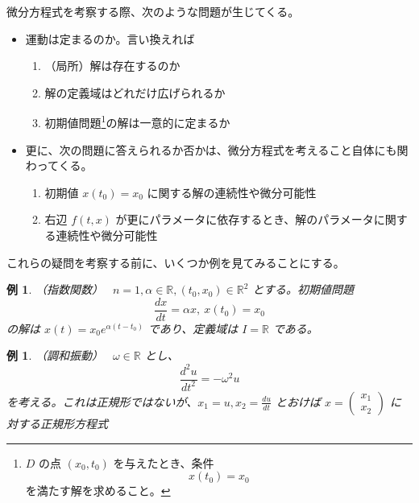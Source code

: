 \documentclass[dvipdfmx, a4paper]{jsreport}
\newcommand{\R}{\mathbb{R}}
\newcommand{\x}{\bm{x}}
\newtheorem{example}[theorem]{例}
\begin{document}
微分方程式を考察する際、次のような問題が生じてくる。

\begin{itemize}
    \item 運動は定まるのか。言い換えれば
        \begin{enumerate}
            \item （局所）解は存在するのか
            \item 解の定義域はどれだけ広げられるか
            \item 初期値問題\footnote{$D$ の点 $(x_0, t_0)$ を与えたとき、条件\begin{equation}x(t_0)=x_0\end{equation}を満たす解を求めること。}の解は一意的に定まるか
        \end{enumerate}
    \item 更に、次の問題に答えられるか否かは、微分方程式を考えること自体にも関わってくる。
        \begin{enumerate}
            \item 初期値 $x(t_0)=x_0$ に関する解の連続性や微分可能性
            \item 右辺 $f(t, x)$ が更にパラメータに依存するとき、解のパラメータに関する連続性や微分可能性
        \end{enumerate}
\end{itemize}

これらの疑問を考察する前に、いくつか例を見てみることにする。

\begin{example}{（指数関数）　}
    $n=1, \alpha\in\R, (t_0, x_0)\in\R^2$ とする。初期値問題
    \[
        \frac{dx}{dt}=\alpha x,\ x(t_0)=x_0\]
    の解は $x(t)=x_0e^{\alpha(t-t_0)}$ であり、定義域は $I=\R$ である。
\end{example}

\begin{example}{（調和振動）　}
    $\omega\in\R$ とし、
    \[
        \frac{d^2 u}{dt^2}=-\omega^2 u\]
    を考える。これは正規形ではないが、$x_1=u, x_2=\frac{du}{dt}$ とおけば $x=\left(\begin{matrix}x_1\\x_2\end{matrix}\right)$ に対する正規形方程式
\end{example}
\end{document}
